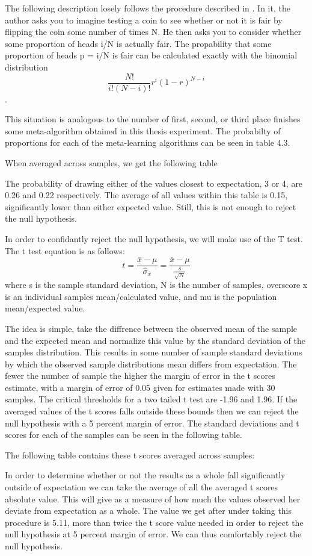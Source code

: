 The following description losely follows the procedure described in \cite{Cohen}.
In it, the author asks you to imagine testing a coin to see whether or not it
is fair by flipping the coin some number of times N. He then asks you to consider
whether some proportion of heads i/N is actually fair. The propability that some
proportion of heads p = i/N is fair can be calculated exactly with the binomial
distribution $$\frac{N!}{i!(N-i)!}r^{i}(1-r)^{N-i}$$.

This situation is analogous to the number of first, second, or third place
finishes some meta-algorithm obtained in this thesis experiment. The probabilty
of proportions for each of the meta-learning algorithms can be seen in table 4.3.

When averaged across samples, we get the following table

The probability of drawing either of the values closest to expectation, 3 or 4,
are 0.26 and 0.22 respectively. The average of all values within this table is
0.15, significantly lower than either expected value. Still, this is not enough
to reject the null hypothesis.

In order to confidantly reject the null hypothesis, we will make use of the
T test.  The t test equation is as follows:
$$t =\frac{\overline{x}-\mu}{\hat{\sigma}_{\overline{x}}} = \frac{\overline{x}-\mu}{\frac{s}{\sqrt{N}}}$$
where s is the sample standard deviation, N is the
number of samples, overscore x is an individual samples mean/calculated value,
and mu is the population mean/expected value.

The idea is simple, take the diffrence between the observed mean of the sample
and the expected mean and normalize this value by the standard deviation of the
samples distribution. This results in some number of sample standard deviations
by which the observed sample distributions mean differs from expectation. The
fewer the number of sample the higher the margin of error in the t scores
estimate, with a margin of error of 0.05 given for estimates made with 30
samples. The critical thresholds for a two tailed t test are -1.96 and 1.96.
If the averaged values of the t scores falls outside these bounds then we can
reject the null hypothesis with a 5 percent margin of error. The standard
deviations and t scores for each of the samples can be seen in the following
table.

The following table contains these t scores averaged across samples:

In order to determine whether or not the results as a whole fall significantly
outside of expectation we can take the average of all the averaged t scores
absolute value. This will give as a measure of how much the values observed her
deviate from expectation as a whole. The value we get after under taking this
procedure is 5.11, more than twice the t score value needed in order to
reject the null hypothesis at 5 percent margin of error. We can thus comfortably
reject the null hypothesis.

